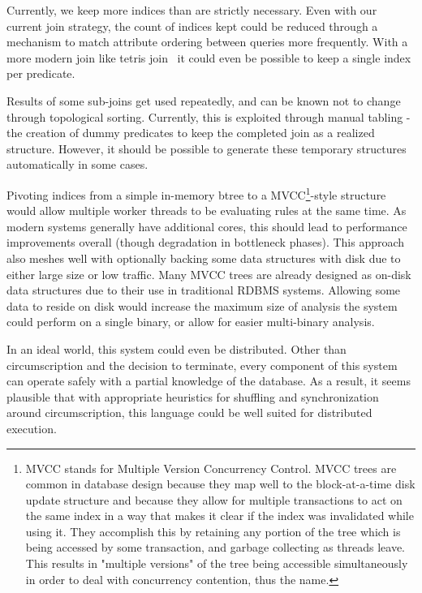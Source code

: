 Currently, we keep more indices than are strictly necessary.
Even with our current join strategy, the count of indices kept could be reduced through a mechanism to match attribute ordering between queries more frequently.
With a more modern join like tetris join~\cite{tetris} it could even be possible to keep a single index per predicate.

Results of some sub-joins get used repeatedly, and can be known not to change through topological sorting.
Currently, this is exploited through manual tabling - the creation of dummy predicates to keep the completed join as a realized structure.
However, it should be possible to generate these temporary structures automatically in some cases.

Pivoting indices from a simple in-memory btree to a MVCC\footnote{
	MVCC stands for Multiple Version Concurrency Control.
	MVCC trees are common in database design because they map well to the block-at-a-time disk update structure and because they allow for multiple transactions to act on the same index in a way that makes it clear if the index was invalidated while using it.
	They accomplish this by retaining any portion of the tree which is being accessed by some transaction, and garbage collecting as threads leave.
	This results in "multiple versions" of the tree being accessible simultaneously in order to deal with concurrency contention, thus the name.
}-style structure would allow multiple worker threads to be evaluating rules at the same time.
As modern systems generally have additional cores, this should lead to performance improvements overall (though degradation in bottleneck phases).
This approach also meshes well with optionally backing some data structures with disk due to either large size or low traffic.
Many MVCC trees are already designed as on-disk data structures due to their use in traditional RDBMS systems.
Allowing some data to reside on disk would increase the maximum size of analysis the system could perform on a single binary, or allow for easier multi-binary analysis.

In an ideal world, this system could even be distributed.
Other than circumscription and the decision to terminate, every component of this system can operate safely with a partial knowledge of the database.
As a result, it seems plausible that with appropriate heuristics for shuffling and synchronization around circumscription, this language could be well suited for distributed execution.
